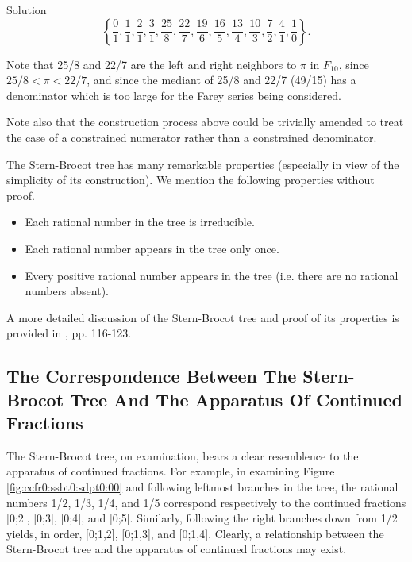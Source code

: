 \begin{vworkexampleparsection}{Solution}
\begin{equation}
\left\{ {\frac{0}{1}, \frac{1}{1}, \frac{2}{1}, 
         \frac{3}{1}, \frac{25}{8}, \frac{22}{7}, \frac{19}{6}, 
		 \frac{16}{5}, \frac{13}{4}, \frac{10}{3}, \frac{7}{2},
         \frac{4}{1}, \frac{1}{0} } \right\}. 
\end{equation}

Note that 25/8 and 22/7 are the left and right neighbors to
$\pi$ in $F_{10}$, since $25/8 < \pi < 22/7$, and since the 
mediant of 25/8 and 22/7 (49/15) has a denominator which is
too large for the Farey series being considered.

Note also that the construction process above could be 
trivially amended to treat the case of a constrained numerator 
rather than a constrained denominator.
\end{vworkexampleparsection}
\vworkexamplefooter{}

The Stern-Brocot tree has many remarkable properties (especially in view of the 
simplicity of its construction).  We mention the following properties
without proof.

\begin{itemize}
\item Each rational number in the tree is irreducible.

\item Each rational number appears in the tree only once.

\item Every positive rational number appears in the tree (i.e. there are no rational
      numbers absent).
\end{itemize}

A more detailed discussion of the Stern-Brocot tree and proof of its
properties is provided
in \cite{bibref:b:concretemathematics}, pp. 116-123.

\subsection{The Correspondence Between The Stern-Brocot Tree And The
            Apparatus Of Continued Fractions}
\label{ccfr0:ssbt0:sdpt1}

The Stern-Brocot tree, on examination, bears a clear resemblence to
the apparatus of continued fractions.  For example, in examining
Figure \ref{fig:ccfr0:ssbt0:sdpt0:00} and following leftmost branches in 
the tree, the rational numbers 1/2, 1/3, 1/4, and 1/5 correspond respectively
to the continued fractions [0;2], [0;3], [0;4], and [0;5].  Similarly,
following 
the right branches down from 1/2 yields, in order, [0;1,2], [0;1,3], and 
[0;1,4].  Clearly, a relationship between the Stern-Brocot tree and the
apparatus of continued fractions may exist.

